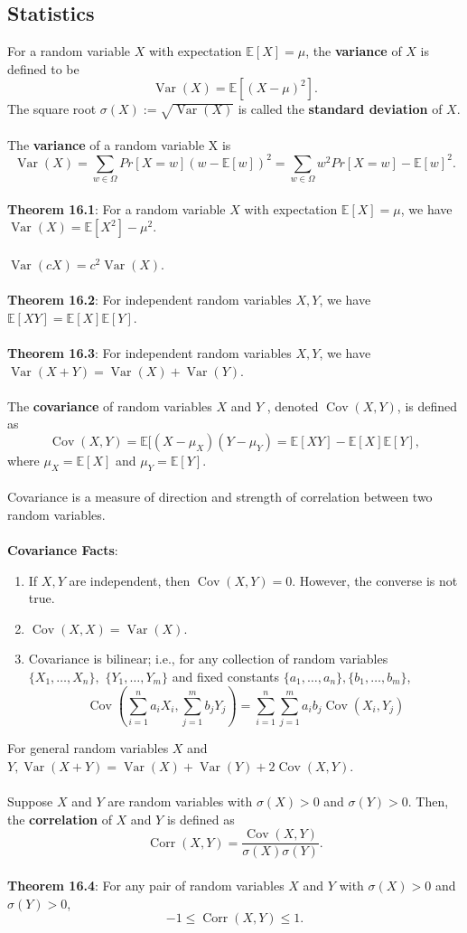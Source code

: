 \documentclass{article}
\theoremstyle{definition}
\DeclareMathOperator{\Var}{Var}
\DeclareMathOperator{\Cov}{Cov}
\DeclareMathOperator{\Corr}{Corr}
\begin{document}
\subsection*{Statistics}
For a random variable $X$ with expectation $\mathbb{E}[X] = \mu$, the \textbf{variance} of $X$ is defined to be $$\Var(X) = \mathbb{E}[(X - \mu)^2].$$ The square root $\sigma(X) := \sqrt{\Var(X)}$ is called the \textbf{standard deviation} of $X$. \\ \\
The \textbf{variance} of a random variable X is $$\Var(X) = \sum_{w \in \Omega} Pr[X = w](w - \mathbb{E}[w])^2 = \sum_{w \in \Omega} w^2Pr[X = w] - \mathbb{E}[w]^2.$$ \\
\textbf{Theorem 16.1}: For a random variable $X$ with expectation $\mathbb{E}[X] = \mu$, we have $\Var(X) = \mathbb{E}[X^2] - \mu^2$. \\ \\
$\Var(cX) = c^2\Var(X)$. \\ \\
\textbf{Theorem 16.2}: For independent random variables $X, Y$, we have $\mathbb{E}[XY] = \mathbb{E}[X]\mathbb{E}[Y]$. \\ \\
\textbf{Theorem 16.3}: For independent random variables $X,Y$, we have $\Var(X +Y) = \Var(X) + \Var(Y)$. \\ \\
The \textbf{covariance} of random variables $X$ and $Y$ , denoted $\Cov(X,Y)$, is defined as $$\Cov(X,Y) = \mathbb{E}[(X  -  \mu_X)(Y - \mu_Y) = \mathbb{E}[XY] - \mathbb{E}[X]\mathbb{E}[Y],$$ where $\mu_X = \mathbb{E}[X]$ and $\mu_Y = \mathbb{E}[Y]$. \\ \\
Covariance is a measure of direction and strength of correlation between two random variables. \\ \\
\textbf{Covariance Facts}: \begin{enumerate}
    \item If $X, Y$ are independent, then $\Cov(X,Y) = 0$. However, the converse is not true.
    \item $\Cov(X,X) = \Var(X)$.
    \item Covariance is bilinear; i.e., for any collection of random variables $\{X_1, \dots, X_n\},$ $\{Y_1, \dots, Y_m\}$ and fixed constants $\{a_1, \dots, a_n\}, \{b_1, \dots, b_m\}$, $$\Cov(\sum_{i = 1}^n a_iX_i, \sum_{j = 1}^m b_j Y_j) = \sum_{i = 1}^n \sum_{j = 1}^m a_ib_j\Cov(X_i, Y_j)$$
\end{enumerate} $ $ \\
For general random variables $X$ and $Y, \Var(X +Y) = \Var(X) + \Var(Y) + 2\Cov(X,Y)$. \\ \\
Suppose $X$ and $Y$ are random variables with $\sigma(X) > 0$ and $\sigma(Y) > 0$. Then, the \textbf{correlation} of $X$ and $Y$ is defined as $$\Corr(X, Y) = \frac{\Cov(X, Y)}{\sigma(X) \sigma(Y)}.$$ \\
\textbf{Theorem 16.4}: For any pair of random variables $X$ and $Y$ with $\sigma(X) > 0$ and $\sigma(Y) > 0$, $$-1 \leq \Corr(X,Y) \leq 1.$$
\end{document}
